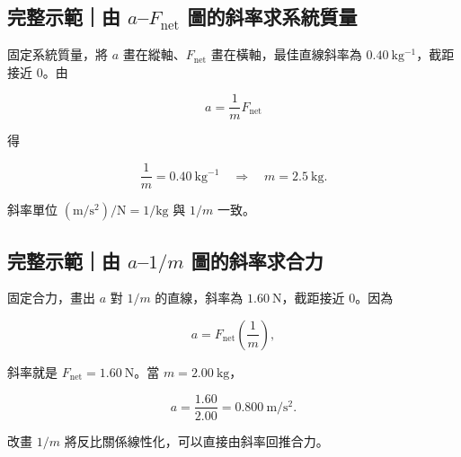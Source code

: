 \documentclass[11pt,a4paper]{article}
\begin{document}
\begin{HandoutWorkedExample}

\subsection{\texorpdfstring{完整示範｜由 \(a\)--\(F_{\mathrm{net}}\) 圖的斜率求系統質量}{完整示範｜由 a--F\_\{\textbackslash mathrm\{net\}\} 圖的斜率求系統質量}}\label{ux5b8cux6574ux793aux7bc4ux7531-af_mathrmnet-ux5716ux7684ux659cux7387ux6c42ux7cfbux7d71ux8ceaux91cf}

固定系統質量，將 \(a\) 畫在縱軸、\(F_{\mathrm{net}}\) 畫在橫軸，最佳直線斜率為 \(0.40\ \mathrm{kg^{-1}}\)，截距接近 0。由

\[
a=\frac1mF_{\mathrm{net}}
\]

得

\[
\frac1m=0.40\ \mathrm{kg^{-1}}
\quad\Rightarrow\quad
m=2.5\ \mathrm{kg}.
\]

斜率單位 \((\mathrm{m/s^2})/\mathrm N=1/\mathrm{kg}\) 與 \(1/m\) 一致。

\end{HandoutWorkedExample}

\begin{HandoutWorkedExample}

\subsection{\texorpdfstring{完整示範｜由 \(a\)--\(1/m\) 圖的斜率求合力}{完整示範｜由 a--1/m 圖的斜率求合力}}\label{ux5b8cux6574ux793aux7bc4ux7531-a1m-ux5716ux7684ux659cux7387ux6c42ux5408ux529b}

固定合力，畫出 \(a\) 對 \(1/m\) 的直線，斜率為 \(1.60\ \mathrm N\)，截距接近 0。因為

\[
a=F_{\mathrm{net}}\left(\frac1m\right),
\]

斜率就是 \(F_{\mathrm{net}}=1.60\ \mathrm N\)。當 \(m=2.00\ \mathrm{kg}\)，

\[
a=\frac{1.60}{2.00}=0.800\ \mathrm{m/s^2}.
\]

改畫 \(1/m\) 將反比關係線性化，可以直接由斜率回推合力。

\end{HandoutWorkedExample}
\end{document}
